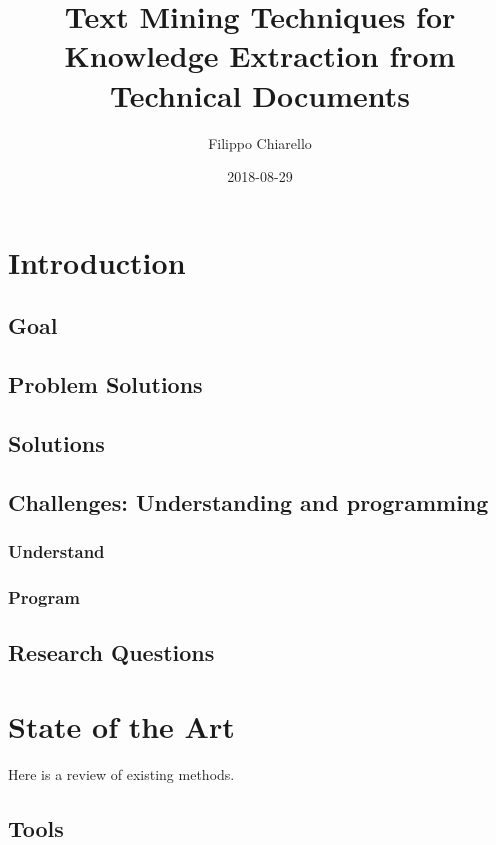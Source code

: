 \documentclass[]{book}
\title{Text Mining Techniques for Knowledge Extraction from Technical Documents}
\author{Filippo Chiarello}
\date{2018-08-29}
\begin{document}
\maketitle

{
\setcounter{tocdepth}{1}
\tableofcontents
}
\chapter{Introduction}\label{intro}

\section{Goal}\label{goal}

\section{Problem Solutions}\label{problem-solutions}

\section{Solutions}\label{solutions}

\section{Challenges: Understanding and
programming}\label{challenges-understanding-and-programming}

\subsection{Understand}\label{understand}

\subsection{Program}\label{program}

\section{Research Questions}\label{research-questions}

\chapter{State of the Art}\label{state-of-the-art}

Here is a review of existing methods.

\section{Tools}\label{tools}
\end{document}
